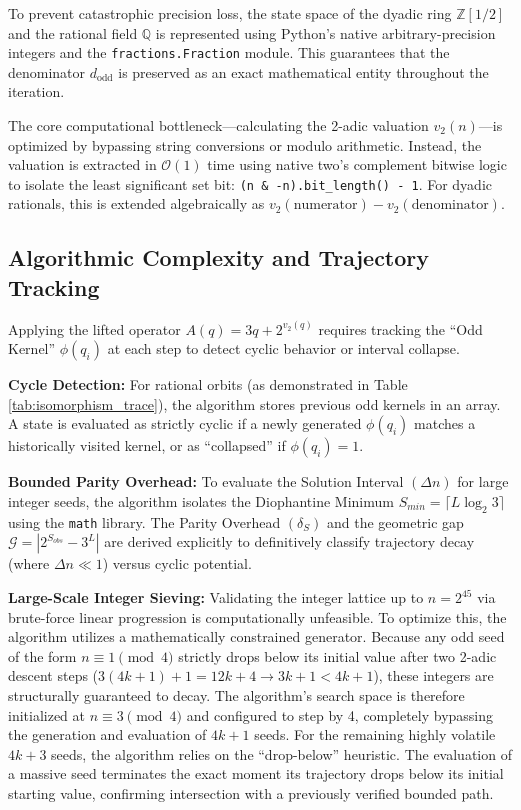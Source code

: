 \documentclass[11pt, a4paper]{article}
\theoremstyle{definition}
\begin{document}
To prevent catastrophic precision loss, the state space of the dyadic ring $\mathbb{Z}[1/2]$ and the rational field $\mathbb{Q}$ is represented using Python's native arbitrary-precision integers and the \texttt{fractions.Fraction} module. This guarantees that the denominator $d_{\text{odd}}$ is preserved as an exact mathematical entity throughout the iteration.

The core computational bottleneck---calculating the 2-adic valuation $v_{2}(n)$---is optimized by bypassing string conversions or modulo arithmetic. Instead, the valuation is extracted in $\mathcal{O}(1)$ time using native two's complement bitwise logic to isolate the least significant set bit: \texttt{(n \& -n).bit\_length() - 1}. For dyadic rationals, this is extended algebraically as $v_2(\text{numerator}) - v_2(\text{denominator})$.

\subsection{Algorithmic Complexity and Trajectory Tracking}
Applying the lifted operator $A(q) = 3q + 2^{v_{2}(q)}$ requires tracking the ``Odd Kernel'' $\phi(q_i)$ at each step to detect cyclic behavior or interval collapse.

\textbf{Cycle Detection:} For rational orbits (as demonstrated in Table \ref{tab:isomorphism_trace}), the algorithm stores previous odd kernels in an array. A state is evaluated as strictly cyclic if a newly generated \(\phi(q_i)\) matches a historically visited kernel, or as ``collapsed'' if \(\phi(q_i) = 1\).

\textbf{Bounded Parity Overhead:} To evaluate the Solution Interval $(\Delta n)$ for large integer seeds, the algorithm isolates the Diophantine Minimum $S_{min} = \lceil L \log_2 3 \rceil$ using the \texttt{math} library. The Parity Overhead $(\delta_S)$ and the geometric gap $\mathcal{G} = |2^{S_{obs}} - 3^L|$ are derived explicitly to definitively classify trajectory decay (where $\Delta n \ll 1$) versus cyclic potential.

\textbf{Large-Scale Integer Sieving:} Validating the integer lattice up to $n=2^{45}$ via brute-force linear progression is computationally unfeasible. To optimize this, the algorithm utilizes a mathematically constrained generator. Because any odd seed of the form $n \equiv 1 \pmod 4$ strictly drops below its initial value after two 2-adic descent steps ($3(4k+1)+1 = 12k+4 \rightarrow 3k+1 < 4k+1$), these integers are structurally guaranteed to decay. The algorithm's search space is therefore initialized at $n \equiv 3 \pmod 4$ and configured to step by 4, completely bypassing the generation and evaluation of $4k+1$ seeds. For the remaining highly volatile $4k+3$ seeds, the algorithm relies on the ``drop-below'' heuristic. The evaluation of a massive seed terminates the exact moment its trajectory drops below its initial starting value, confirming intersection with a previously verified bounded path.
\end{document}
